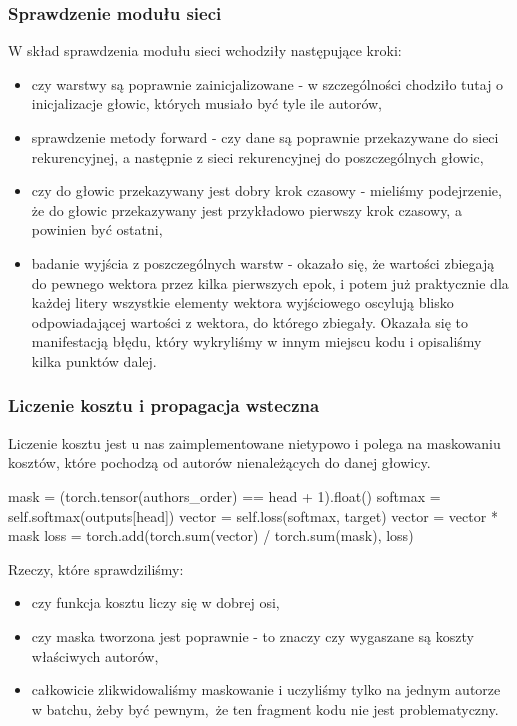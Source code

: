 \subsubsection{Sprawdzenie modułu sieci}
W skład sprawdzenia modułu sieci wchodziły następujące kroki:
	\begin{itemize}
	  \item {czy warstwy są poprawnie zainicjalizowane - w szczególności chodziło tutaj o inicjalizacje głowic,
	  których musiało być tyle ile autorów,}
	  \item {sprawdzenie metody forward - czy dane są poprawnie przekazywane do sieci rekurencyjnej, a następnie
	  z sieci rekurencyjnej do poszczególnych głowic,}
	  \item {czy do głowic przekazywany jest dobry krok czasowy - mieliśmy podejrzenie, że do głowic przekazywany jest przykładowo
	  pierwszy krok czasowy, a powinien być ostatni,}
	  \newpage
	  \item {badanie wyjścia z poszczególnych warstw - okazało się, że wartości zbiegają do pewnego wektora przez kilka pierwszych epok,
	  i potem już praktycznie dla każdej litery wszystkie elementy wektora wyjściowego oscylują blisko odpowiadającej wartości z  wektora,
	  do którego zbiegały. Okazała się to manifestacją błędu, który wykryliśmy w innym miejscu kodu i opisaliśmy kilka punktów dalej.}
	\end{itemize}

\subsubsection{Liczenie kosztu i propagacja wsteczna}
Liczenie kosztu jest u nas zaimplementowane nietypowo i polega na maskowaniu kosztów, które pochodzą od autorów
nienależących do danej głowicy.
\begin{python}
mask = (torch.tensor(authors_order) == head + 1).float()
softmax = self.softmax(outputs[head])
vector = self.loss(softmax, target)
vector = vector * mask
loss = torch.add(torch.sum(vector) / torch.sum(mask), loss)

\end{python}
Rzeczy, które sprawdziliśmy:
\begin{itemize}
	  \item {czy funkcja kosztu liczy się w dobrej osi,}
	  \item {czy maska tworzona jest poprawnie - to znaczy czy wygaszane są koszty właściwych autorów,}
	  \item {całkowicie zlikwidowaliśmy maskowanie i uczyliśmy tylko na jednym autorze w batchu, żeby być pewnym, że ten fragment
	  kodu nie jest problematyczny.}
\end{itemize}

